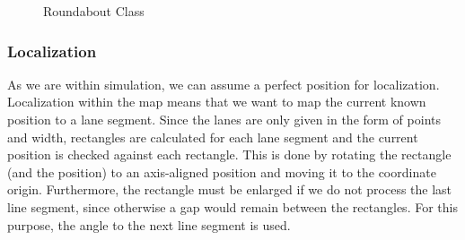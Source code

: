 \documentclass[11pt,oneside,openright]{mpreport}
\begin{document}
\begin{figure}[!ht]
\begin{center}
\caption{Roundabout Class}
\label{roundabout_class}
\end{center}
\end{figure}


\subsubsection{Localization}
As we are within simulation, we can assume a perfect position for localization. Localization within the map means that we want to map 
the current known position to a lane segment. Since the lanes are only given in the form of points and width, rectangles are calculated
for each lane segment and the current position is checked against each rectangle.
This is done by rotating the rectangle (and the position) to an axis-aligned position and moving it to the coordinate origin. Furthermore, the rectangle must be enlarged if we
do not process the last line segment, since otherwise a gap would remain between the rectangles. For this purpose, the angle to the next line segment is used.
\end{document}
